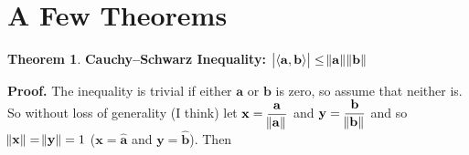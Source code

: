 \documentclass{article}
\theoremstyle{definition}
\newtheorem{theorem}{Theorem}[section]
\begin{document}
\medskip
\section{A Few Theorems}
\bigskip
\begin{theorem} {\bf Cauchy–Schwarz Inequality:} 
$\big | \langle \mathbf{a},\mathbf{b} \rangle \big | \leq 
\norm{\mathbf{a}} \norm{\mathbf{b}}$


\bigskip
{
\noindent
{\bf Proof.} The inequality is trivial if either $ \mathbf{a}$ or
$\mathbf{b}$ is zero, so assume that neither is. So without loss
of generality (I think) let ${\displaystyle \mathbf{x} =
\frac{\mathbf{a}}{\norm{\mathbf{a}}}}$ and ${\displaystyle
\mathbf{y} = \frac{\mathbf{b}}{\norm{\mathbf{b}}}}$ and so $\norm{
\mathbf{x}} = \norm{\mathbf{y}} = 1$ ($\mathbf{x} =
\mathbf{\hat{a}}$ and $\mathbf{y} = \mathbf{\hat{b}}$).  Then
\par}



\end{theorem}
\end{document}
